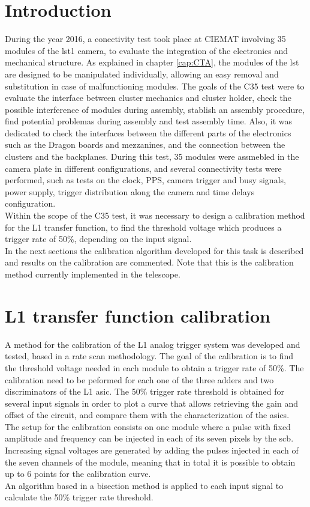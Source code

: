 \documentclass[main.tex]{subfiles}
\begin{document}
\glsresetall

\section{Introduction}

During the year 2016, a conectivity test took place at CIEMAT involving 35 modules of the \gls{lst}1 camera, to evaluate the integration of the electronics and mechanical structure. As explained in chapter \ref{cap:CTA}, the modules of the \gls{lst} are designed to be manipulated individually, allowing an easy removal and substitution in case of malfunctioning modules. The goals of the C35 test were to evaluate the interface between cluster mechanics and cluster holder, check the possible interference of modules during assembly, stablish an assembly procedure, find potential problemas during assembly and test assembly time. Also, it was dedicated to check the interfaces between the different parts of the electronics such as the Dragon boards and mezzanines, and the connection between the clusters and the backplanes. During this test, 35 modules were assmebled in the camera plate in different configurations, and several connectivity tests were performed, such as tests on the clock, PPS, camera trigger and busy signals, power supply, trigger distribution along the camera and time delays configuration.\\
Within the scope of the C35 test, it was necessary to design a calibration method for the L1 transfer function, to find the threshold voltage which produces a trigger rate of 50\%, depending on the input signal.\\
In the next sections the calibration algorithm developed for this task is described and results on the calibration are commented. Note that this is the calibration method currently implemented in the telescope.

\section{L1 transfer function calibration}

A method for the calibration of the L1 analog trigger system was developed and tested, based in a rate scan methodology. The goal of the calibration is to find the threshold voltage needed in each module to obtain a trigger rate of 50\%. The calibration need to be peformed for each one of the three adders and two discriminators of the L1 \gls{asic}. The 50\% trigger rate threshold is obtained for several input signals in order to plot a curve that allows retrieving the gain and offset of the circuit, and compare them
with the characterization of the \glspl{asic}. \\
The setup for the calibration consists on one module where a pulse with fixed amplitude and frequency can be injected in each of its seven pixels by the \gls{scb}. Increasing signal voltages are generated by adding the pulses injected in each of the seven channels of the module, meaning that in total it is possible to obtain up to 6 points for the calibration curve.\\
An algorithm based in a bisection method is applied to each input signal to calculate the 50\% trigger rate threshold.
\end{document}
